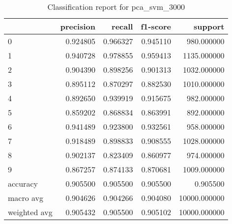 \begin{table}[htb!]
\centering
\caption{Classification report for pca_svm_3000}
\label{tab:classification-report-pca_svm_3000}
\begin{tabular}{lrrrr}
\toprule
 & precision & recall & f1-score & support \\
\midrule
0 & 0.924805 & 0.966327 & 0.945110 & 980.000000 \\
1 & 0.940728 & 0.978855 & 0.959413 & 1135.000000 \\
2 & 0.904390 & 0.898256 & 0.901313 & 1032.000000 \\
3 & 0.895112 & 0.870297 & 0.882530 & 1010.000000 \\
4 & 0.892650 & 0.939919 & 0.915675 & 982.000000 \\
5 & 0.859202 & 0.868834 & 0.863991 & 892.000000 \\
6 & 0.941489 & 0.923800 & 0.932561 & 958.000000 \\
7 & 0.918489 & 0.898833 & 0.908555 & 1028.000000 \\
8 & 0.902137 & 0.823409 & 0.860977 & 974.000000 \\
9 & 0.867257 & 0.874133 & 0.870681 & 1009.000000 \\
accuracy & 0.905500 & 0.905500 & 0.905500 & 0.905500 \\
macro avg & 0.904626 & 0.904266 & 0.904080 & 10000.000000 \\
weighted avg & 0.905432 & 0.905500 & 0.905102 & 10000.000000 \\
\bottomrule
\end{tabular}
\end{table}
